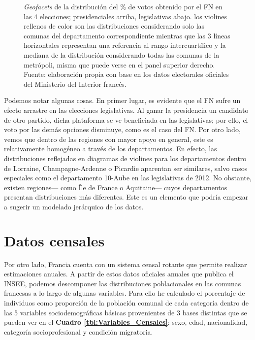 \begin{figure}[h]
\begin{subfigure}{0.4\textwidth}
	\end{subfigure}
	\caption{\textit{Geofacets} de la distribución del \% de votos obtenido por el FN en las 4 elecciones; presidenciales arriba, legislativas abajo. los violines rellenos de color son las distribuciones considerando solo las comunas del departamento correspondiente mientras que las 3 líneas horizontales representan una referencia al rango intercuartílico y la mediana de la distribución considerando todas las comunas de la metrópoli, misma que puede verse en el panel superior derecho. Fuente: elaboración propia con base en los datos electorales oficiales del Ministerio del Interior francés.}
	\label{fig:Geofacet_Distr_Dptos_FN}	
\end{figure}

Podemos notar algunas cosas. En primer lugar, es evidente que el FN sufre un efecto arrastre en las elecciones legislativas. Al ganar la presidencia un candidato de otro partido, dicha plataforma se ve beneficiada en las legislativas; por ello, el voto por las demás opciones disminuye, como es el caso del FN. Por otro lado, vemos que dentro de las regiones con mayor apoyo en general, este es relativamente homogéneo a través de los departamentos. En efecto, las distribuciones reflejadas en diagramas de violines para los departamentos dentro de Lorraine, Champagne-Ardenne o Picardie aparentan ser similares, salvo casos especiales como el departamento 10-Aube en las legislativas de 2012. No obstante, existen regiones--- como Île de France o Aquitaine--- cuyos departamentos presentan distribuciones más diferentes. Este es un elemento que podría empezar a sugerir un modelado jerárquico de los datos.

\section{Datos censales}

Por otro lado, Francia cuenta con un sistema censal rotante que permite realizar estimaciones anuales. A partir de estos datos oficiales anuales que publica el INSEE, podemos descomponer las distribuciones poblacionales en las comunas francesas a lo largo de algunas variables. Para ello he calculado el porcentaje de individuos como proporción de la población comunal de cada categoría dentro de las 5 variables sociodemográficas básicas provenientes de 3 bases distintas que se pueden ver en el \textbf{Cuadro \ref{tbl:Variables_Censales}}: sexo, edad, nacionalidad, categoría socioprofesional y condición migratoria.\\ 

